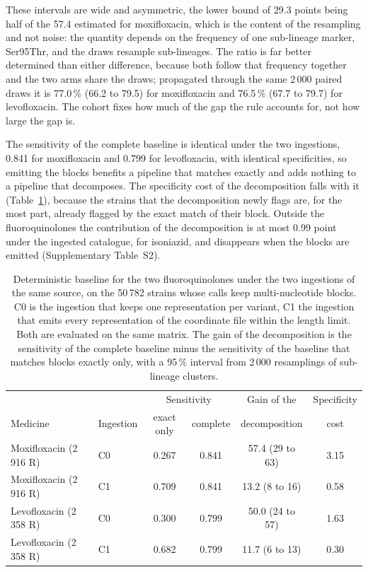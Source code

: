 \documentclass[11pt]{article}
\begin{document}
These intervals are wide and asymmetric, the lower bound of 29.3 points being half of the 57.4
estimated for moxifloxacin, which is the content of the resampling and not noise: the quantity
depends on the frequency of one sub-lineage marker, Ser95Thr, and the draws resample
sub-lineages. The ratio is far better determined than either difference, because both follow
that frequency together and the two arms share the draws; propagated through the same 2\,000
paired draws it is 77.0\,\% (66.2 to 79.5) for moxifloxacin and 76.5\,\% (67.7 to 79.7) for
levofloxacin. The cohort fixes how
much of the gap the rule accounts for, not how large the gap is.

The sensitivity of the complete baseline is identical under the two ingestions, 0.841 for
moxifloxacin and 0.799 for levofloxacin, with identical specificities, so emitting the
blocks benefits a pipeline that matches exactly and adds nothing to a pipeline that
decomposes. The specificity cost of the decomposition falls with it
(Table~\ref{tab:fq}), because the strains
that the decomposition newly flags are, for the most part, already flagged by the exact
match of their block. Outside the fluoroquinolones the contribution of the decomposition
is at most 0.99 point under the ingested catalogue, for isoniazid, and disappears when the
blocks are emitted (Supplementary Table~S2).

\begin{table}[t]
\centering
\caption{Deterministic baseline for the two fluoroquinolones under the two ingestions of
the same source, on the 50\,782 strains whose calls keep multi-nucleotide blocks. C0 is the
ingestion that keeps one representation per variant, C1 the ingestion that emits every
representation of the coordinate file within the length limit. Both are evaluated on the
same matrix. The gain of the decomposition is the sensitivity of the complete baseline
minus the sensitivity of the baseline that matches blocks exactly only, with a 95\,\%
interval from 2\,000 resamplings of sub-lineage clusters.}
\label{tab:fq}
\begin{tabular}{llcccc}
\toprule
 & & \multicolumn{2}{c}{Sensitivity} & Gain of the & Specificity \\
Medicine & Ingestion & exact only & complete & decomposition & cost \\
\midrule
Moxifloxacin (2\,916 R) & C0 & 0.267 & 0.841 & 57.4 (29 to 63) & 3.15 \\
Moxifloxacin (2\,916 R) & C1 & 0.709 & 0.841 & 13.2 (8 to 16) & 0.58 \\
Levofloxacin (2\,358 R) & C0 & 0.300 & 0.799 & 50.0 (24 to 57) & 1.63 \\
Levofloxacin (2\,358 R) & C1 & 0.682 & 0.799 & 11.7 (6 to 13) & 0.30 \\
\bottomrule
\end{tabular}
\end{table}
\end{document}
